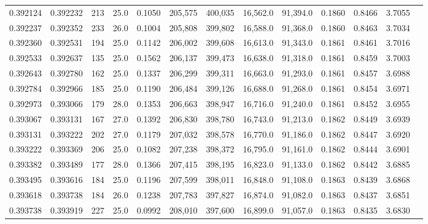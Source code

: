 \begin{tabular}{rrrrrrrrrrrrr}
0.392124 & 0.392232 &   213 & 25.0 &                                     0.1050 & 205,575 & 400,035 &  16,562.0 &  91,394.0 & 0.1860 & 0.8466 & 3.7055 \\
0.392237 & 0.392352 &   233 & 26.0 &                                     0.1004 & 205,808 & 399,802 &  16,588.0 &  91,368.0 & 0.1860 & 0.8463 & 3.7034 \\
0.392360 & 0.392531 &   194 & 25.0 &                                     0.1142 & 206,002 & 399,608 &  16,613.0 &  91,343.0 & 0.1861 & 0.8461 & 3.7016 \\
0.392533 & 0.392637 &   135 & 25.0 &                                     0.1562 & 206,137 & 399,473 &  16,638.0 &  91,318.0 & 0.1861 & 0.8459 & 3.7003 \\
0.392643 & 0.392780 &   162 & 25.0 &                                     0.1337 & 206,299 & 399,311 &  16,663.0 &  91,293.0 & 0.1861 & 0.8457 & 3.6988 \\
0.392784 & 0.392966 &   185 & 25.0 &                                     0.1190 & 206,484 & 399,126 &  16,688.0 &  91,268.0 & 0.1861 & 0.8454 & 3.6971 \\
0.392973 & 0.393066 &   179 & 28.0 &                                     0.1353 & 206,663 & 398,947 &  16,716.0 &  91,240.0 & 0.1861 & 0.8452 & 3.6955 \\
0.393067 & 0.393131 &   167 & 27.0 &                                     0.1392 & 206,830 & 398,780 &  16,743.0 &  91,213.0 & 0.1862 & 0.8449 & 3.6939 \\
0.393131 & 0.393222 &   202 & 27.0 &                                     0.1179 & 207,032 & 398,578 &  16,770.0 &  91,186.0 & 0.1862 & 0.8447 & 3.6920 \\
0.393222 & 0.393369 &   206 & 25.0 &                                     0.1082 & 207,238 & 398,372 &  16,795.0 &  91,161.0 & 0.1862 & 0.8444 & 3.6901 \\
0.393382 & 0.393489 &   177 & 28.0 &                                     0.1366 & 207,415 & 398,195 &  16,823.0 &  91,133.0 & 0.1862 & 0.8442 & 3.6885 \\
0.393495 & 0.393616 &   184 & 25.0 &                                     0.1196 & 207,599 & 398,011 &  16,848.0 &  91,108.0 & 0.1863 & 0.8439 & 3.6868 \\
0.393618 & 0.393738 &   184 & 26.0 &                                     0.1238 & 207,783 & 397,827 &  16,874.0 &  91,082.0 & 0.1863 & 0.8437 & 3.6851 \\
0.393738 & 0.393919 &   227 & 25.0 &                                     0.0992 & 208,010 & 397,600 &  16,899.0 &  91,057.0 & 0.1863 & 0.8435 & 3.6830 \\

\end{tabular}
